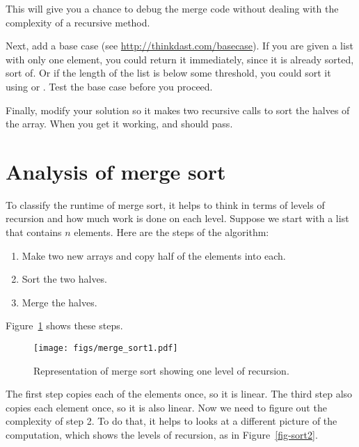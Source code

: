 \documentclass[12pt]{book}
\theoremstyle{exercise}
\begin{document}
This will give you a chance to debug the merge code without dealing with
the complexity of a recursive method.


Next, add a base case (see
\url{http://thinkdast.com/basecase}). If you are
given a list with only one element, you could return it immediately,
since it is already sorted, sort of. Or if the length of the list is
below some threshold, you could sort it using 
or . Test the base case before you proceed.

Finally, modify your solution so it makes two recursive calls to sort
the halves of the array. When you get it working, 
and  should pass.


\section{Analysis of merge sort}
\label{analysis-of-merge-sort}


To classify the runtime of merge sort, it helps to think in terms of
levels of recursion and how much work is done on each level. Suppose
we start with a list that contains $n$ elements. Here are the steps of
the algorithm:

\begin{enumerate}

\item
  Make two new arrays and copy half of the elements into each.

\item
  Sort the two halves.

\item
  Merge the halves.

\end{enumerate}

Figure~\ref{fig-sort1}
shows these steps.

\begin{figure}
\centering
\texttt{[image: figs/merge\_sort1.pdf]}
\caption{Representation of merge sort showing one level of recursion.}
\label{fig-sort1}
\end{figure}


The first step copies each of the elements once, so it is linear. The
third step also copies each element once, so it is also linear. Now we
need to figure out the complexity of step 2. To do that, it helps to
looks at a different picture of the computation, which shows the levels
of recursion, as in Figure~\ref{fig-sort2}.
\end{document}
